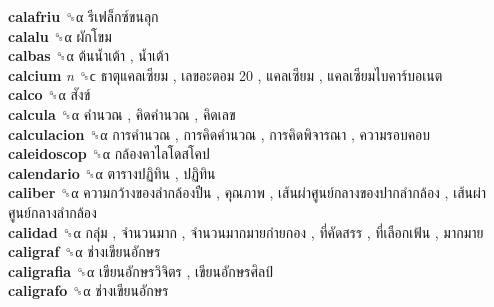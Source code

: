 \textbf{calafriu} ␝α   รีเฟล็กซ์ขนลุก   \\
\textbf{calalu} ␝α   ผักโขม   \\
\textbf{calbas} ␝α   ต้นน้ำเต้า ,  น้ำเต้า   \\
\textbf{calcium} \emph{n}  ␝ϲ   ธาตุแคลเซียม ,  เลขอะตอม 20 ,  แคลเซียม ,  แคลเซียมไบคาร์บอเนต   \\
\textbf{calco} ␝α   สังข์   \\
\textbf{calcula} ␝α   คำนวณ ,  คิดคำนวณ ,  คิดเลข   \\
\textbf{calculacion} ␝α   การคำนวณ ,  การคิดคำนวณ ,  การคิดพิจารณา ,  ความรอบคอบ   \\
\textbf{caleidoscop} ␝α   กล้องคาไลโดสโคป   \\
\textbf{calendario} ␝α   ตารางปฏิทิน ,  ปฏิทิน   \\
\textbf{caliber} ␝α   ความกว้างของลำกล้องปืน ,  คุณภาพ ,  เส้นผ่าศูนย์กลางของปากลำกล้อง ,  เส้นผ่าศูนย์กลางลำกล้อง   \\
\textbf{calidad} ␝α   กลุ่ม ,  จำนวนมาก ,  จำนวนมากมายก่ายกอง ,  ที่คัดสรร ,  ที่เลือกเฟ้น ,  มากมาย   \\
\textbf{caligraf} ␝α   ช่างเขียนอักษร   \\
\textbf{caligrafia} ␝α   เขียนอักษรวิจิตร ,  เขียนอักษรศิลป์   \\
\textbf{caligrafo} ␝α   ช่างเขียนอักษร   \\

